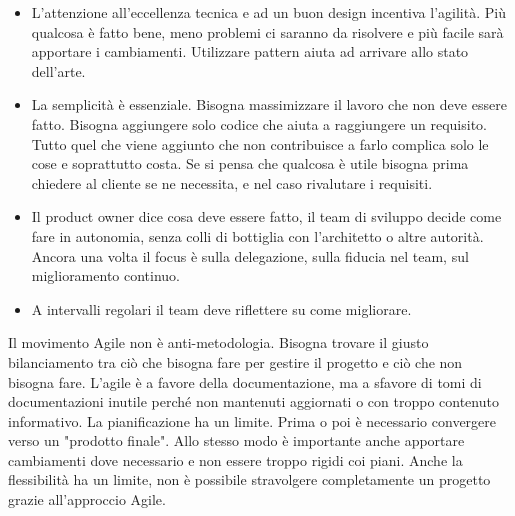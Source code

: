\begin{itemize}
	\item L'attenzione all'eccellenza tecnica e ad un buon design incentiva l'agilità. Più qualcosa è fatto bene, meno problemi ci saranno da risolvere e più facile sarà apportare i cambiamenti. Utilizzare pattern aiuta ad arrivare allo stato dell'arte.
	\item La semplicità è essenziale. Bisogna massimizzare il lavoro che non deve essere fatto. Bisogna aggiungere solo codice che aiuta a raggiungere un requisito. Tutto quel che viene aggiunto che non contribuisce a farlo complica solo le cose e soprattutto costa. Se si pensa che qualcosa è utile bisogna prima chiedere al cliente se ne necessita, e nel caso rivalutare i requisiti.
	\item Il product owner dice cosa deve essere fatto, il team di sviluppo decide come fare in autonomia, senza colli di bottiglia con l'architetto o altre autorità. Ancora una volta il focus è sulla delegazione, sulla fiducia nel team, sul miglioramento continuo.
	\item A intervalli regolari il team deve riflettere su come migliorare.
\end{itemize}
Il movimento Agile non è anti-metodologia. Bisogna trovare il giusto bilanciamento tra ciò che bisogna fare per gestire il progetto e ciò che non bisogna fare.
L'agile è a favore della documentazione, ma a sfavore di tomi di documentazioni inutile perché non mantenuti aggiornati o con troppo contenuto informativo.\newline
La pianificazione ha un limite. Prima o poi è necessario convergere verso un "prodotto finale". Allo stesso modo è importante anche apportare cambiamenti dove necessario e non essere troppo rigidi coi piani. Anche la flessibilità ha un limite, non è possibile stravolgere completamente un progetto grazie all'approccio Agile.

\newpage
